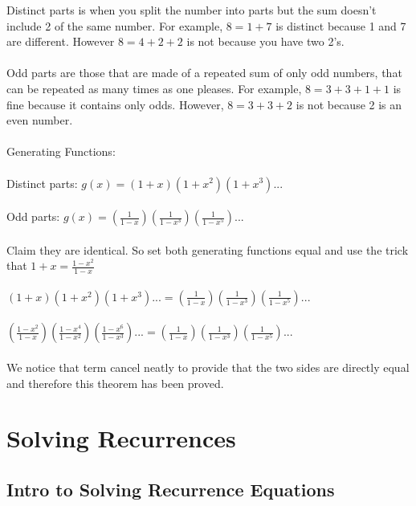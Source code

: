 Distinct parts is when you split the number into parts but the sum doesn't include 2 of the same number. For example, $8 = 1 + 7$ is distinct because 1 and 7 are different. However $8 = 4 + 2 + 2$ is not because you have two 2's. \\\\
Odd parts are those that are made of a repeated sum of only odd numbers, that can be repeated as many times as one pleases. For example, $8 = 3 + 3 + 1 + 1$ is fine because it contains only odds. However, $8 = 3 + 3 + 2$ is not because 2 is an even number.\\\\
Generating Functions:\\\\
Distinct parts: $g(x) = (1+x)(1+x^2)(1+x^3)...$\\\\
Odd parts: $g(x) = (\frac{1}{1-x})(\frac{1}{1-x^3})(\frac{1}{1-x^5})...$\\\\
Claim they are identical. So set both generating functions equal and use the trick that $1+x = \frac{1-x^2}{1-x}$ \\\\
$(1+x)(1+x^2)(1+x^3)... = (\frac{1}{1-x})(\frac{1}{1-x^3})(\frac{1}{1-x^5})...$\\\\
$(\frac{1-x^2}{1-x})(\frac{1-x^4}{1-x^2})(\frac{1-x^6}{1-x^3})... = (\frac{1}{1-x})(\frac{1}{1-x^3})(\frac{1}{1-x^5})...$\\\\
We notice that term cancel neatly to provide that the two sides are directly equal and therefore this theorem has been proved.

\section{Solving Recurrences }
\subsection{Intro to Solving Recurrence Equations}

